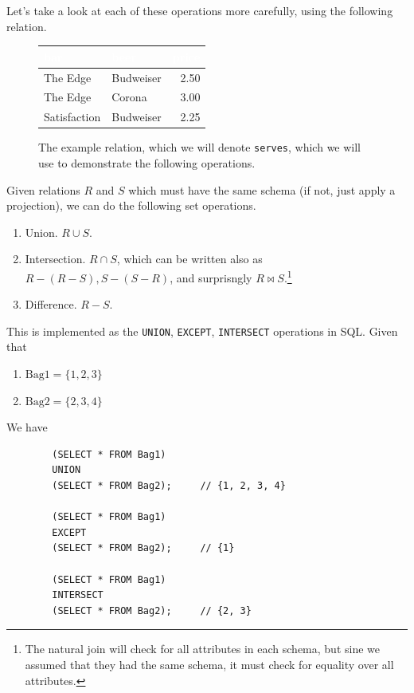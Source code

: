 \documentclass{article}
\begin{document}
    Let's take a look at each of these operations more carefully, using the following relation. 

    \begin{figure}[H]
      \centering
      \begin{tabular}{|l|l|r|}
      \hline
      \rowcolor[HTML]{E26B0A} 
      \textcolor{white}{\textbf{bar}} & \textcolor{white}{\textbf{beer}} & \textcolor{white}{\textbf{price}} \\ \hline
      \rowcolor[HTML]{FBCEB1}
      The Edge & Budweiser & 2.50 \\ \hline
      \rowcolor[HTML]{FBCEB1}
      The Edge & Corona & 3.00 \\ \hline
      \rowcolor[HTML]{FBCEB1}
      Satisfaction & Budweiser & 2.25 \\ \hline
      \end{tabular}
      \caption{The example relation, which we will denote \texttt{serves}, which we will use to demonstrate the following operations.} 
      \label{fig:serves}
    \end{figure}
    
    \begin{definition}
      Given relations $R$ and $S$ which must have the same schema (if not, just apply a projection), we can do the following set operations. 
      \begin{enumerate}
        \item Union. $R \cup S$. 
        \item Intersection. $R \cap S$, which can be written also as $R - (R - S), S - (S - R)$, and surprisngly $R \bowtie S$.\footnote{The natural join will check for all attributes in each schema, but sine we assumed that they had the same schema, it must check for equality over all attributes.}
        \item Difference. $R - S$. 
      \end{enumerate}
      This is implemented as the \texttt{UNION}, \texttt{EXCEPT}, \texttt{INTERSECT} operations in SQL. Given that 
      \begin{enumerate}
        \item $\mathrm{Bag1} = \{1, 2, 3\}$
        \item $\mathrm{Bag2} = \{2, 3, 4\}$
      \end{enumerate}
      We have 
      \begin{lstlisting}
        (SELECT * FROM Bag1) 
        UNION 
        (SELECT * FROM Bag2);     // {1, 2, 3, 4}

        (SELECT * FROM Bag1) 
        EXCEPT 
        (SELECT * FROM Bag2);     // {1} 

        (SELECT * FROM Bag1) 
        INTERSECT 
        (SELECT * FROM Bag2);     // {2, 3}
      \end{lstlisting}
    \end{definition}
\end{document}
